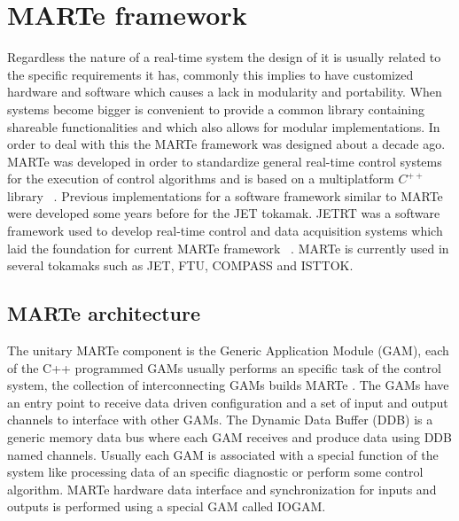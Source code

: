 \section{MARTe framework}
Regardless the nature of a real-time system the design of it is usually related to the specific requirements it has, commonly this implies to have customized hardware and software which causes a lack in modularity and portability. When systems become bigger is convenient to provide a common library containing shareable functionalities and which also allows for modular implementations. In order to deal with this the MARTe framework was designed about a decade ago. MARTe was developed in order to standardize general real-time control systems for the execution of control algorithms and is based on a multiplatform $C^{++}$ library ~\cite{Neto2010}.  Previous implementations for a  software framework similar to MARTe were developed some years before for the JET tokamak. JETRT was a software framework used to develop real-time control and data acquisition systems which laid the foundation for current MARTe framework ~\cite{JETRT}. MARTe is currently used in several tokamaks such as JET, FTU, COMPASS and ISTTOK. 

\subsection{MARTe architecture }
The unitary MARTe component is the Generic Application Module (GAM), each of the C++ programmed GAMs usually performs an specific task of the control system, the collection of interconnecting GAMs builds MARTe  \cite{Neto2011}. The GAMs  have an entry point to receive data driven configuration and a set of input and output channels to interface with other GAMs. The Dynamic Data Buffer (DDB) is a generic memory data bus where each GAM receives and produce data using DDB named channels. Usually each GAM is associated with a special function of the system like processing data of an specific diagnostic or perform some  control algorithm. MARTe hardware data interface and synchronization for inputs and outputs is performed using a special GAM called IOGAM.


